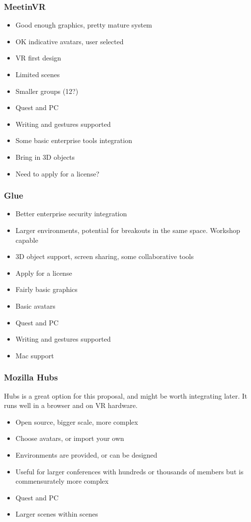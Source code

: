 \subsubsection{MeetinVR}
\begin{itemize}
\item Good enough graphics, pretty mature system
\item OK indicative avatars, user selected
\item VR first design
\item Limited scenes
\item Smaller groups (12?)
\item Quest and PC
\item Writing and gestures supported
\item Some basic enterprise tools integration
\item Bring in 3D objects
\item Need to apply for a license?
\end{itemize}
\subsubsection{Glue}
\begin{itemize}
\item Better enterprise security integration
\item Larger environments, potential for breakouts in the same space. Workshop capable
\item 3D object support, screen sharing, some collaborative tools
\item Apply for a license
\item Fairly basic graphics
\item Basic avatars
\item Quest and PC
\item Writing and gestures supported
\item Mac support
\end{itemize}
\subsubsection{Mozilla Hubs}
Hubs is a great option for this proposal, and might be worth integrating later. It runs well in a browser and on VR hardware.
\begin{itemize}
\item Open source, bigger scale, more complex
\item Choose avatars, or import your own
\item Environments are provided, or can be designed
\item Useful for larger conferences with hundreds or thousands of members but is commensurately more complex
\item Quest and PC
\item Larger scenes within scenes
\end{itemize}
